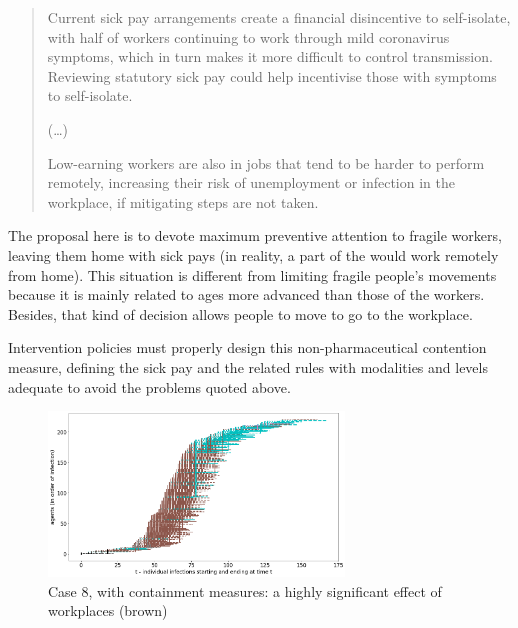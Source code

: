 \documentclass[11pt]{article}
\begin{document}
\begin{quote}
Current sick pay arrangements create a financial disincentive to self-isolate, with half of workers continuing to work through mild coronavirus symptoms, which in turn makes it more difficult to control transmission. Reviewing statutory sick pay could help incentivise those with symptoms to self-isolate.

(\ldots)

Low-earning workers are also in jobs that tend to be harder to perform remotely, increasing their risk of unemployment or infection in the workplace, if mitigating steps are not taken.
\end{quote}

The proposal here is to devote maximum preventive attention to fragile workers, leaving them home with sick pays (in reality, a part of the would work remotely from home). This situation is different from limiting fragile people's movements because it is mainly related to ages more advanced than those of the workers. Besides, that kind of decision allows people to move to go to the workplace. 

Intervention policies must properly design this non-pharmaceutical contention measure, defining the sick pay and the related rules with modalities and levels adequate to avoid the problems quoted above.

\begin{figure}[H]
\begin{center}
\includegraphics[width=0.7\textwidth]{withShort1.png}%
\caption{Case 8, with containment measures: a highly significant effect of workplaces (brown)}
\label{1}
\end{center}
\end{figure}
\end{document}
